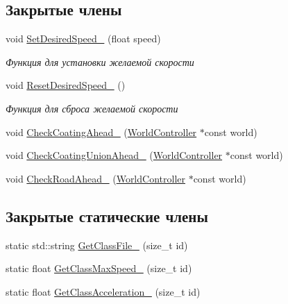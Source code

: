 \subsection*{Закрытые члены}
\begin{DoxyCompactItemize}
\item 
\mbox{\label{classrtm_1_1_car_object_a7b2f6f775bca42de1f8a171967ef4a5b}} 
void \hyperlink{classrtm_1_1_car_object_a7b2f6f775bca42de1f8a171967ef4a5b}{Set\+Desired\+Speed\+\_\+} (float speed)
\begin{DoxyCompactList}\small\item\em Функция для установки желаемой скорости \end{DoxyCompactList}\item 
\mbox{\label{classrtm_1_1_car_object_ac7d862334533fc10e079cec616f1c143}} 
void \hyperlink{classrtm_1_1_car_object_ac7d862334533fc10e079cec616f1c143}{Reset\+Desired\+Speed\+\_\+} ()
\begin{DoxyCompactList}\small\item\em Функция для сброса желаемой скорости \end{DoxyCompactList}\item 
void \hyperlink{classrtm_1_1_car_object_a9e80c9029d84c425b43d6a0559d0c76c}{Check\+Coating\+Ahead\+\_\+} (\hyperlink{classrtm_1_1_world_controller}{World\+Controller} $\ast$const world)
\item 
void \hyperlink{classrtm_1_1_car_object_a0cd1f15e3b28edde4271b92da250339f}{Check\+Coating\+Union\+Ahead\+\_\+} (\hyperlink{classrtm_1_1_world_controller}{World\+Controller} $\ast$const world)
\item 
void \hyperlink{classrtm_1_1_car_object_a8d8a11c484ce1afd532b78688345f314}{Check\+Road\+Ahead\+\_\+} (\hyperlink{classrtm_1_1_world_controller}{World\+Controller} $\ast$const world)
\end{DoxyCompactItemize}
\subsection*{Закрытые статические члены}
\begin{DoxyCompactItemize}
\item 
static std\+::string \hyperlink{classrtm_1_1_car_object_adb159ab782445563511287d3535aa9f4}{Get\+Class\+File\+\_\+} (size\+\_\+t id)
\item 
static float \hyperlink{classrtm_1_1_car_object_a0e69f04edd9f51f57a1d0fd39e2b0976}{Get\+Class\+Max\+Speed\+\_\+} (size\+\_\+t id)
\item 
static float \hyperlink{classrtm_1_1_car_object_a45d798bf2079173c677358b4b54d4e2b}{Get\+Class\+Acceleration\+\_\+} (size\+\_\+t id)
\end{DoxyCompactItemize}
